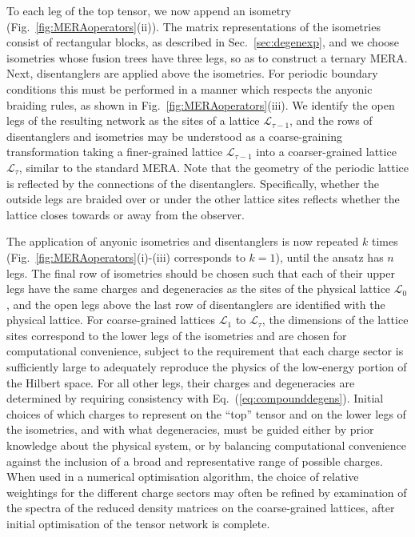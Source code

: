 \documentclass[aps,prb,reprint,superscriptaddress,amsfonts,amsmath,amssymb,showpacs,floatfix]{revtex4-1}
\newcommand{\mc}[1]{\mathcal{#1}}
\newcommand{\eref}[1]{(\ref{#1})}
\newcommand{\fref}[1]{Fig.~\ref{#1}}
\newcommand{\sref}[1]{Sec.~\ref{#1}}
\newcommand{\citestop}[1]{.\cite{#1}}
\begin{document}
To each leg of the top tensor, we now append an isometry (\fref{fig:MERAoperators}(ii)). The matrix representations of the isometries consist of rectangular blocks, as described in \sref{sec:degenexp}, and we choose isometries whose fusion trees have three legs, so as to construct a ternary MERA\citestop{evenbly2009} Next, disentanglers are applied above the isometries.
For periodic boundary conditions this must be performed in a manner which respects the anyonic braiding rules, as shown in \fref{fig:MERAoperators}(iii). 
We identify the open legs of the resulting network as the sites of a lattice $\mc{L}_{\tau-1}$, and the rows of disentanglers and isometries may be understood as a coarse-graining transformation taking a finer-grained lattice $\mc{L}_{\tau-1}$ into a coarser-grained lattice $\mc{L}_\tau$, similar to the standard MERA. 
Note that the geometry of the periodic lattice is reflected by the connections of the disentanglers.
Specifically, whether the outside legs are braided over or under the other lattice sites reflects whether the lattice closes towards or away from the observer. 
 
The application of anyonic isometries and disentanglers is now repeated $k$ times (\fref{fig:MERAoperators}(i)-(iii) corresponds to $k=1$), until the ansatz has $n$ legs. The final row of isometries should be chosen such that each of their upper legs have the same charges and degeneracies as the sites of the physical lattice $\mc{L}_0$, and the open legs above the last row of disentanglers are identified with the physical lattice. For coarse-grained lattices $\mc{L}_1$ to $\mc{L}_\tau$, the dimensions of the lattice sites correspond to the lower legs of the isometries and are chosen for computational convenience, subject to the requirement that %
each charge sector is sufficiently large to adequately reproduce the physics of the low-energy portion of the Hilbert space. For all other legs, their charges and degeneracies are determined by requiring consistency with Eq.~\eref{eq:compounddegens}. Initial choices of which charges to represent on the ``top'' tensor and on the lower legs of the isometries, and with what degeneracies, must be guided either by prior knowledge about the physical system, or by balancing computational convenience against the inclusion of a broad and representative range of possible charges. When used in a numerical optimisation algorithm, the choice of relative weightings for the different charge sectors may often be refined by examination of the spectra of the reduced density matrices on the coarse-grained lattices, after initial optimisation of the tensor network is complete.
\end{document}
